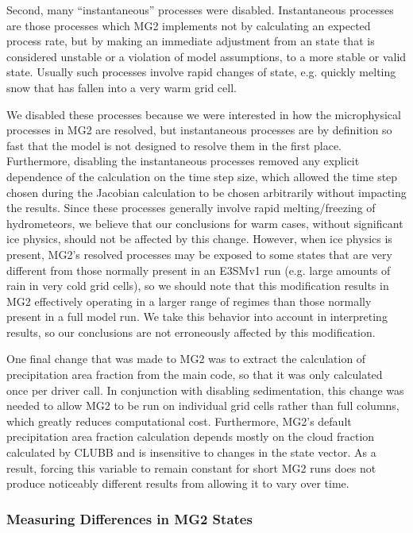 \documentclass [11pt, proquest] {uwthesis}[2020/02/24]
\begin{document}
Second, many ``instantaneous'' processes were disabled. Instantaneous processes are those processes which MG2 implements not by calculating an expected process rate, but by making an immediate adjustment from an state that is considered unstable or a violation of model assumptions, to a more stable or valid state. Usually such processes involve rapid changes of state, e.g. quickly melting snow that has fallen into a very warm grid cell.

We disabled these processes because we were interested in how the microphysical processes in MG2 are resolved, but instantaneous processes are by definition so fast that the model is not designed to resolve them in the first place. Furthermore, disabling the instantaneous processes removed any explicit dependence of the calculation on the time step size, which allowed the time step chosen during the Jacobian calculation to be chosen arbitrarily without impacting the results. Since these processes generally involve rapid melting/freezing of hydrometeors, we believe that our conclusions for warm cases, without significant ice physics, should not be affected by this change. However, when ice physics is present, MG2's resolved processes may be exposed to some states that are very different from those normally present in an E3SMv1 run (e.g. large amounts of rain in very cold grid cells), so we should note that this modification results in MG2 effectively operating in a larger range of regimes than those normally present in a full model run. We take this behavior into account in interpreting results, so our conclusions are not erroneously affected by this modification.

One final change that was made to MG2 was to extract the calculation of precipitation area fraction from the main code, so that it was only calculated once per driver call. In conjunction with disabling sedimentation, this change was needed to allow MG2 to be run on individual grid cells rather than full columns, which greatly reduces computational cost. Furthermore, MG2's default precipitation area fraction calculation depends mostly on the cloud fraction calculated by CLUBB and is insensitive to changes in the state vector. As a result, forcing this variable to remain constant for short MG2 runs does not produce noticeably different results from allowing it to vary over time.

\subsubsection{Measuring Differences in MG2 States}
\end{document}
